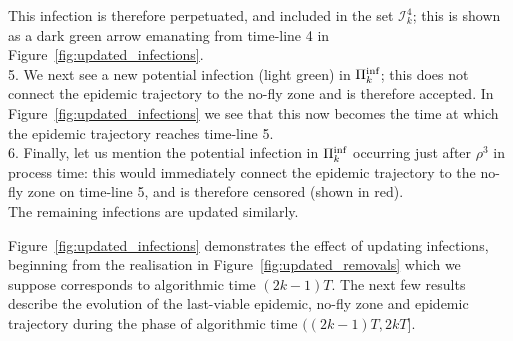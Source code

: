 \documentclass[]{article}
\newcommand{\Infections}{\mathcal{I}}
\newcommand{\Poisson}{\Pi}
\newcommand{\PoissonInf}{\Poisson^\textup{inf}}
\begin{document}
\begin{Figure}
{	This infection is therefore perpetuated, and included in the set \(\Infections^4_k\);
	this is shown as a dark green arrow emanating from time-line 4 in Figure~\ref{fig:updated_infections}.
\\
5. We next see a new potential infection (light green) in \(\PoissonInf_k\); 
	this does not connect the epidemic trajectory to the no-fly zone and is therefore accepted. 
	In Figure~\ref{fig:updated_infections} we see that this now becomes 
	the time at which the epidemic trajectory reaches time-line 5.
\\
6. Finally, let us mention the potential infection in \(\PoissonInf_k\) 
	occurring just after \(\rho^3\) in process time: 
	this would immediately connect the epidemic trajectory to the no-fly zone on time-line 5, 
	and is therefore censored (shown in red).
\\
The remaining infections are updated similarly. 
		\label{fig:updated_infections}} 
\end{Figure}

Figure~\ref{fig:updated_infections} demonstrates the effect of updating infections,
beginning from the realisation in Figure~\ref{fig:updated_removals}
which we suppose corresponds to algorithmic time \((2k{-}1)T\).%
The next few results describe the evolution of the last-viable epidemic, 
no-fly zone and epidemic trajectory during the phase of algorithmic time \(((2k{-}1)T, 2kT]\).
\end{document}

